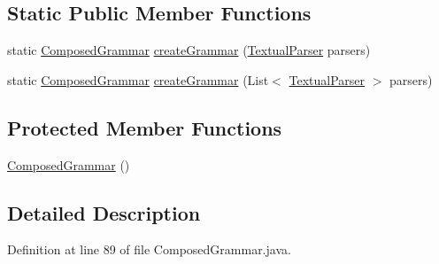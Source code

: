 \subsection*{Static Public Member Functions}
\begin{DoxyCompactItemize}
\item 
static \hyperlink{classit_1_1emarolab_1_1cagg_1_1core_1_1evaluation_1_1interfacing_1_1ComposedGrammar}{Composed\-Grammar} \hyperlink{classit_1_1emarolab_1_1cagg_1_1core_1_1evaluation_1_1interfacing_1_1ComposedGrammar_a1b8e6114e33a17c6030f63135fc624d3}{create\-Grammar} (\hyperlink{classit_1_1emarolab_1_1cagg_1_1core_1_1language_1_1parser_1_1TextualParser}{Textual\-Parser} parsers)
\item 
static \hyperlink{classit_1_1emarolab_1_1cagg_1_1core_1_1evaluation_1_1interfacing_1_1ComposedGrammar}{Composed\-Grammar} \hyperlink{classit_1_1emarolab_1_1cagg_1_1core_1_1evaluation_1_1interfacing_1_1ComposedGrammar_a1bcd2ecfd811e183ce6b0365e287e7b7}{create\-Grammar} (List$<$ \hyperlink{classit_1_1emarolab_1_1cagg_1_1core_1_1language_1_1parser_1_1TextualParser}{Textual\-Parser} $>$ parsers)
\end{DoxyCompactItemize}
\subsection*{Protected Member Functions}
\begin{DoxyCompactItemize}
\item 
\hyperlink{classit_1_1emarolab_1_1cagg_1_1core_1_1evaluation_1_1interfacing_1_1ComposedGrammar_aab8c104c158e3e1e9402d973699ffb6b}{Composed\-Grammar} ()
\end{DoxyCompactItemize}


\subsection{Detailed Description}


Definition at line 89 of file Composed\-Grammar.\-java.



